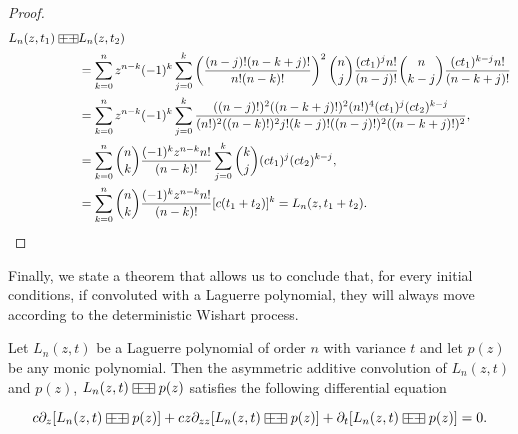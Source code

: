 \begin{proof}
    \begin{align*}
        L_n(z,t_1) \aac& L_n(z,t_2) \\
        &= \sum_{k=0}^n z^{n-k}(-1)^k \sum_{j=0}^k \left(\frac{(n-j)!(n-k+j)!}{n!(n-k)!}\right)^2\binom{n}{j}\frac{(ct_1)^jn!}{(n-j)!}\binom{n}{k-j}\frac{(ct_1)^{k-j} n!}{(n-k+j)!}\\ 
        &= \sum_{k=0}^n z^{n-k}(-1)^k \sum_{j=0}^k \frac{((n-j)!)^2((n-k+j)!)^2(n!)^4(ct_1)^j(ct_2)^{k-j}}{(n!)^2((n-k)!)^2j!(k-j)!((n-j)!)^2((n-k+j)!)^2},\\ 
        &= \sum_{k=0}^n \binom{n}{k} \frac{(-1)^k z^{n-k}n!}{(n-k)!}\sum_{j=0}^k \binom{k}{j}(ct_1)^j(ct_2)^{k-j}, \\  
        &=  \sum_{k=0}^n \binom{n}{k} \frac{(-1)^k z^{n-k}n!}{(n-k)!}[c(t_1 + t_2)]^k = L_n(z,t_1 + t_2).
    \end{align*}
\end{proof}

Finally, we state a theorem that allows us to conclude that, for every initial conditions, if convoluted with a Laguerre polynomial, they will always move according to the deterministic Wishart process.

\begin{theorem}
    Let $L_n(z,t)$ be a Laguerre polynomial of order $n$ with variance $t$ and let $p(z)$ be any monic polynomial. Then the asymmetric additive convolution of $L_n(z,t)$ and $p(z)$, $L_n(z,t) \aac p(z)$ satisfies the following differential equation

    \begin{equation*}
        c\partial_z [L_n(z,t) \aac p(z)] + cz \partial_{zz}[L_n(z,t) \aac p(z)] + \partial_t [L_n(z,t) \aac p(z)] = 0.
    \end{equation*}
\end{theorem}

